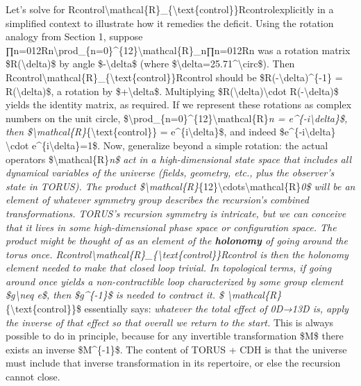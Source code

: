 \documentclass[]{article}
\begin{document}
{Let's solve for
Rcontrol\textbackslash{}mathcal\{R\}\_\{\textbackslash{}text\{control\}\}Rcontrol​
explicitly in a simplified context to illustrate how it remedies the
deficit. Using the rotation analogy from Section 1, suppose
∏n=012Rn\textbackslash{}prod\_\{n=0\}\^{}\{12\}\textbackslash{}mathcal\{R\}\_n∏n=012​Rn​
was a rotation matrix \$R(\textbackslash{}delta)\$ by angle
\$-\textbackslash{}delta\$ (where
\$\textbackslash{}delta=25.71\^{}\textbackslash{}circ\$). Then
Rcontrol\textbackslash{}mathcal\{R\}\_\{\textbackslash{}text\{control\}\}Rcontrol​
should be \$R(-\textbackslash{}delta)\^{}\{-1\} =
R(\textbackslash{}delta)\$, a rotation by \$+\textbackslash{}delta\$.
Multiplying \$R(\textbackslash{}delta)\textbackslash{}cdot
R(-\textbackslash{}delta)\$ yields the identity matrix, as required. If
we represent these rotations as complex numbers on the unit circle,
\$\textbackslash{}prod\_\{n=0\}\^{}\{12\}\textbackslash{}mathcal\{R\}\emph{n
= e\^{}\{-i\textbackslash{}delta\}\$, then
\$\textbackslash{}mathcal\{R\}}\{\textbackslash{}text\{control\}\} =
e\^{}\{i\textbackslash{}delta\}\$, and indeed
\$e\^{}\{-i\textbackslash{}delta\} \textbackslash{}cdot
e\^{}\{i\textbackslash{}delta\}=1\$. Now, generalize beyond a simple
rotation: the actual operators \$\textbackslash{}mathcal\{R\}\emph{n\$
act in a high-dimensional state space that includes all dynamical
variables of the universe (fields, geometry, etc., plus the observer's
state in TORUS). The product
\$\textbackslash{}mathcal\{R\}}\{12\}\textbackslash{}cdots\textbackslash{}mathcal\{R\}\emph{0\$
will be an element of whatever symmetry group describes the recursion's
combined transformations. TORUS's recursion symmetry is intricate, but
we can conceive that it lives in some high-dimensional phase space or
configuration space. The product might be thought of as an element of
the \textbf{holonomy} of going around the torus once.
Rcontrol\textbackslash{}mathcal\{R\}\_\{\textbackslash{}text\{control\}\}Rcontrol​
is then the holonomy element needed to make that closed loop trivial. In
topological terms, if going around once yields a non-contractible loop
characterized by some group element \$g\textbackslash{}neq e\$, then
\$g\^{}\{-1\}\$ is needed to contract it. \$
\textbackslash{}mathcal\{R\}}\{\textbackslash{}text\{control\}\}\$
essentially says: \emph{whatever the total effect of 0D→13D is, apply
the inverse of that effect so that overall we return to the start.} This
is always possible to do in principle, because for any invertible
transformation \$M\$ there exists an inverse \$M\^{}\{-1\}\$. The
content of TORUS + CDH is that the universe must include that inverse
transformation in its repertoire, or else the recursion cannot close.

}
\end{document}
